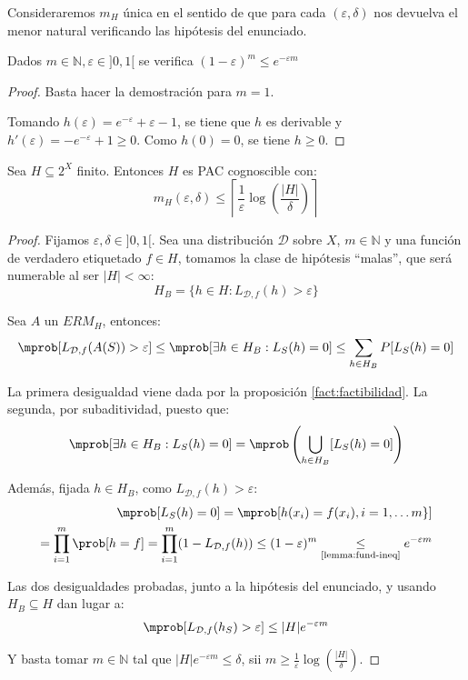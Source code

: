 Consideraremos $m_{H}$ única en el sentido de que para cada $(\varepsilon, \delta)$ nos devuelva el menor natural
verificando las hipótesis del enunciado.

\begin{lemma}
 Dados $m\in \mathbb{N}, \varepsilon\in ]0,1[$ se verifica $(1-\varepsilon)^m \le e^{-\varepsilon m}$
 \label{lemma:fund-ineq}
\end{lemma}
\begin{proof}
 Basta hacer la demostración para $m=1$.
 
 Tomando $h(\varepsilon) = e^{-\varepsilon} + \varepsilon - 1$, se tiene que $h$ es derivable y 
 $h'(\varepsilon) = -e^{-\varepsilon} + 1 \ge 0$. Como $h(0) = 0$, se tiene $h \ge 0$.
\end{proof}

\begin{theorem}
Sea $H \subseteq 2^{X}$ finito. Entonces $H$ es PAC cognoscible con:
\[
  m_H(\varepsilon, \delta) \le \left\lceil \frac{1}{\varepsilon} \log\left(\frac{|H|}{\delta} \right) \right\rceil
\]
\label{th:finitas-pac}
\end{theorem}
  \begin{proof}
   Fijamos $\varepsilon, \delta \in ]0,1[$. Sea una distribución $\mathcal{D}$ sobre $X$, $m\in \mathbb{N}$ y una función de verdadero 
   etiquetado $f\in H$, tomamos la clase de hipótesis ``malas'', que será numerable al ser $|H| < \infty$:
   \[
     H_B = \{h\in H: L_{\mathcal{D},f}(h) > \varepsilon\}
   \]

   Sea $A$ un $ERM_{H}$, entonces:
   \[
     \mprob [L_{\mathcal{D},f}(A(S)) > \varepsilon] \le \mprob 
     [\exists h\in H_B : L_S(h) = 0] \le \sum_{h\in H_B} P [L_S(h) = 0] 
   \]

   La primera desigualdad viene dada por la proposición \ref{fact:factibilidad}. La segunda, por subaditividad, puesto que:
   \[
     \mprob [\exists h\in H_B : L_S(h) = 0] = \mprob \left(\underset{h\in H_B}{\bigcup} [L_S(h) = 0]\right)
   \]

   Además, fijada $h\in H_B$, como $L_{\mathcal{D},f}(h) > \varepsilon$:
   \begin{align*}
   \mprob[L_S(h) = 0] = \mprob[h(x_i) = f(x_i), i =1,\ldots m\}]\\
   = \prod_{i=1}^m \prob[h = f] = \prod_{i=1}^m (1 - L_{\mathcal{D},f}(h)) \le (1-\varepsilon)^m 
   \underset{\textrm{\ref{lemma:fund-ineq}}}{\le} e^{-\varepsilon m}
   \end{align*}

   Las dos desigualdades probadas, junto a la hipótesis del enunciado, y usando $H_B \subseteq H$ dan lugar a:
   \[
     \mprob[L_{\mathcal{D},f}(h_S) > \varepsilon] \le |H|e^{-\varepsilon m}
   \]
   
   Y basta tomar $m\in \mathbb{N}$ tal que $|H|e^{-\varepsilon m} \le \delta$, sii 
   $m\ge \frac{1}{\varepsilon} \log\left(\frac{|H|}{\delta}\right)$.
  \end{proof}

